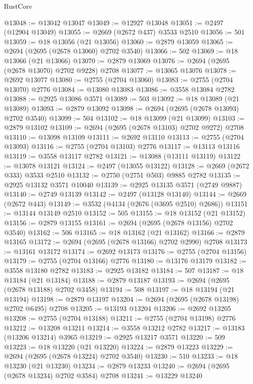 \begin{lexlean}{RustCore}
\begin{coremodule}
@13048 := @13042 @13047
@13049 := @12927 @13048
@13051 := @2497 (@12904 @13049)
@13055 := @2669 (@2672 @437) @3533 @2510
@13056 := 501
@13059 := @18 @13056 (@21 @13056)
@13060 := @2879 @13059
@13065 := @2694 (@2695 (@2678 @13060) @2702 @3540)
@13066 := 502
@13069 := @18 @13066 (@21 @13066)
@13070 := @2879 @13069
@13076 := @2694 (@2695 (@2678 @13070) @2702 @9228) @2708
@13077 := @13065 @13076
@13078 := @2692 @13077
@13080 := @2755 (@2704 @13060)
@13083 := @2755 (@2704 @13070) @2776
@13084 := @13080 @13083
@13086 := @3558 @13084 @2782
@13088 := @2925 @13086 @3571
@13089 := 503
@13092 := @18 @13089 (@21 @13089)
@13093 := @2879 @13092
@13098 := @2694 (@2695 (@2678 @13093) @2702 @3540)
@13099 := 504
@13102 := @18 @13099 (@21 @13099)
@13103 := @2879 @13102
@13109 := @2694 (@2695 (@2678 @13103) @2702 @9272) @2708
@13110 := @13098 @13109
@13111 := @2692 @13110
@13113 := @2755 (@2704 @13093)
@13116 := @2755 (@2704 @13103) @2776
@13117 := @13113 @13116
@13119 := @3558 @13117 @2782
@13121 := @13088 (@13111 @13119)
@13122 := @13078 @13121
@13124 := @2497 (@13055 @13122)
@13128 := @2669 (@2672 @333) @3533 @2510
@13132 := @2750 (@2751 @503) @9885 @2782
@13135 := @2925 @13132 @3571 @10040
@13139 := @2925 @13135 @3571 (@2749 @9887)
@13140 := @2749 @13139
@13142 := @2497 (@13128 @13140)
@13144 := @2669 (@2672 @443)
@13149 := @3532 (@4134 (@2676 (@3695 @2510) @2686))
@13151 := @13144 @13149 @2510
@13152 := 505
@13155 := @18 @13152 (@21 @13152)
@13156 := @2879 @13155
@13161 := @2694 (@2695 (@2678 @13156) @2702 @3540)
@13162 := 506
@13165 := @18 @13162 (@21 @13162)
@13166 := @2879 @13165
@13172 := @2694 (@2695 (@2678 @13166) @2702 @2990) @2708
@13173 := @13161 @13172
@13174 := @2692 @13173
@13176 := @2755 (@2704 @13156)
@13179 := @2755 (@2704 @13166) @2776
@13180 := @13176 @13179
@13182 := @3558 @13180 @2782
@13183 := @2925 @13182
@13184 := 507
@13187 := @18 @13184 (@21 @13184)
@13188 := @2879 @13187
@13193 := @2694 (@2695 (@2678 @13188) @2702 @3458)
@13194 := 508
@13197 := @18 @13194 (@21 @13194)
@13198 := @2879 @13197
@13204 := @2694 (@2695 (@2678 @13198) @2702 @6495) @2708
@13205 := @13193 @13204
@13206 := @2692 @13205
@13208 := @2755 (@2704 @13188)
@13211 := @2755 (@2704 @13198) @2776
@13212 := @13208 @13211
@13214 := @3558 @13212 @2782
@13217 := @13183 (@13206 @13214) @3965
@13219 := @2925 @13217 @3571
@13220 := 509
@13223 := @18 @13220 (@21 @13220)
@13224 := @2879 @13223
@13229 := @2694 (@2695 (@2678 @13224) @2702 @3540)
@13230 := 510
@13233 := @18 @13230 (@21 @13230)
@13234 := @2879 @13233
@13240 := @2694 (@2695 (@2678 @13234) @2702 @3584) @2708
@13241 := @13229 @13240

\end{coremodule}
\end{lexlean}
